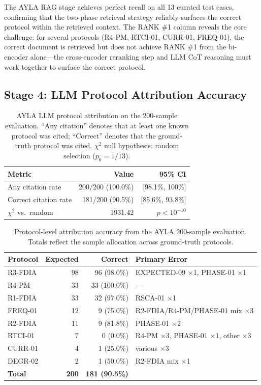\documentclass[twocolumn, 10pt, letterpaper]{article}
\begin{document}
The AYLA RAG stage achieves perfect recall on all 13 curated test cases,
confirming that the two-phase retrieval strategy reliably surfaces the correct protocol
within the retrieved context.
The RANK \#1 column reveals the core challenge: for several protocols (R4-PM,
RTCI-01, CURR-01, FREQ-01), the correct document is retrieved but does not
achieve RANK \#1 from the bi-encoder alone---the cross-encoder reranking step
and LLM CoT reasoning must work together to surface the correct protocol.

\subsection{Stage 4: LLM Protocol Attribution Accuracy}

\begin{table}[H]
\centering
\caption{AYLA LLM protocol attribution on the 200-sample evaluation.
         ``Any citation'' denotes that at least one known protocol was cited;
         ``Correct'' denotes that the ground-truth protocol was cited.
         $\chi^2$ null hypothesis: random selection ($p_0{=}1/13$).}
\label{tab:llm}
\small
\begin{tabular}{lrr}
\toprule
\textbf{Metric} & \textbf{Value} & \textbf{95\% CI} \\
\midrule
Any citation rate    & 200/200 (100.0\%) & [98.1\%, 100\%] \\
Correct citation rate & 181/200 (90.5\%) & [85.6\%, 93.8\%] \\
$\chi^2$ vs.\ random & 1931.42 & $p < 10^{-10}$ \\
\bottomrule
\end{tabular}
\end{table}

\begin{table}[t]
\centering
\caption{Protocol-level attribution accuracy from the AYLA 200-sample evaluation.
         Totals reflect the sample allocation across ground-truth protocols.}
\label{tab:proto_acc}
\begin{tabular}{lrrl}
\toprule
\textbf{Protocol} & \textbf{Expected} & \textbf{Correct} & \textbf{Primary Error} \\
\midrule
R3-FDIA     & 98  & 96 (98.0\%)  & EXPECTED-09 $\times$1, PHASE-01 $\times$1 \\
R4-PM       & 33  & 33 (100.0\%) & --- \\
R1-FDIA     & 33  & 32 (97.0\%)  & RSCA-01 $\times$1 \\
FREQ-01     & 12  & 9  (75.0\%)  & R2-FDIA/R4-PM/PHASE-01 mix $\times$3 \\
R2-FDIA     & 11  & 9  (81.8\%)  & PHASE-01 $\times$2 \\
RTCI-01     & 7   & 0  (0.0\%)   & R4-PM $\times$3, PHASE-01 $\times$1, other $\times$3 \\
CURR-01     & 4   & 1  (25.0\%)  & various $\times$3 \\
DEGR-02     & 2   & 1  (50.0\%)  & R2-FDIA mix $\times$1 \\
\midrule
\textbf{Total} & \textbf{200} & \textbf{181 (90.5\%)} & \\
\bottomrule
\end{tabular}
\end{table}
\end{document}
